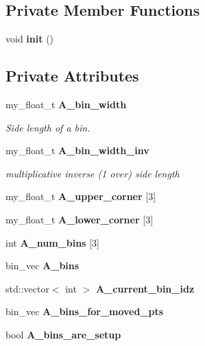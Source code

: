 \subsection*{Private Member Functions}
\begin{CompactItemize}
\item 
void \textbf{init} ()\label{classSimSite3D_1_1geometry_1_1DistanceArray2_3a6b04a93a64eb5d858d75872809ed87}

\end{CompactItemize}
\subsection*{Private Attributes}
\begin{CompactItemize}
\item 
my\_\-float\_\-t \bf{A\_\-bin\_\-width}\label{classSimSite3D_1_1geometry_1_1DistanceArray2_46bf43dba80eca2a90354de43f3e090f}

\begin{CompactList}\small\item\em Side length of a bin. \item\end{CompactList}\item 
my\_\-float\_\-t \bf{A\_\-bin\_\-width\_\-inv}\label{classSimSite3D_1_1geometry_1_1DistanceArray2_d27b3690450da6a8df54915b042e4425}

\begin{CompactList}\small\item\em multiplicative inverse (1 over) side length \item\end{CompactList}\item 
my\_\-float\_\-t \textbf{A\_\-upper\_\-corner} [3]\label{classSimSite3D_1_1geometry_1_1DistanceArray2_c20120c88fe303758aa644279ceae45f}

\item 
my\_\-float\_\-t \textbf{A\_\-lower\_\-corner} [3]\label{classSimSite3D_1_1geometry_1_1DistanceArray2_7ec1a3b6cb3fc3c1fd73d8768fab7cfc}

\item 
int \textbf{A\_\-num\_\-bins} [3]\label{classSimSite3D_1_1geometry_1_1DistanceArray2_da392e2b7b553662d86c53d58e42cb2d}

\item 
bin\_\-vec \textbf{A\_\-bins}\label{classSimSite3D_1_1geometry_1_1DistanceArray2_358d86ba1f5aef66aa85e514e273ed0c}

\item 
std::vector$<$ int $>$ \textbf{A\_\-current\_\-bin\_\-idz}\label{classSimSite3D_1_1geometry_1_1DistanceArray2_ee6a02c194abdc0cd4f4c8caa1b7e238}

\item 
bin\_\-vec \textbf{A\_\-bins\_\-for\_\-moved\_\-pts}\label{classSimSite3D_1_1geometry_1_1DistanceArray2_df002d40101ccf23897a693eaac5084f}

\item 
bool \textbf{A\_\-bins\_\-are\_\-setup}\label{classSimSite3D_1_1geometry_1_1DistanceArray2_da8e60db90bd4144a04d5016294c2d1e}

\end{CompactItemize}


